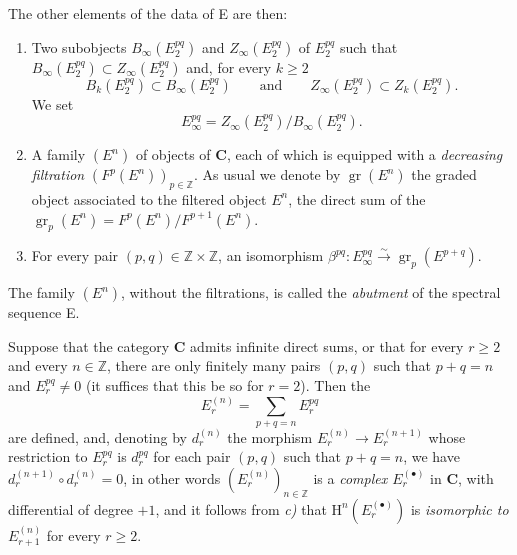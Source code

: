 \begin{env}[11.1.1]
The other elements of the data of E are then:
\begin{enumerate}
  \item[$d)$] Two subobjects $B_\infty(E_2^{pq})$ and
    $Z_\infty(E_2^{pq})$ of $E_2^{pq}$ such that
    $B_\infty(E_2^{pq})\subset Z_\infty(E_2^{pq})$ and, for every $k\geq2$
    \[
      B_k(E_2^{pq})\subset B_\infty(E_2^{pq})
      \qquad\text{and}\qquad
      Z_\infty(E_2^{pq})\subset Z_k(E_2^{pq}).
    \]
    We set
    \[
    \label{0.11.1.1.3}
      E_\infty^{pq}=Z_\infty(E_2^{pq})/B_\infty(E_2^{pq}).
      \tag{11.1.1.3}
    \]
  \item[$e)$]
    A family $(E^n)$ of objects of $\boldsymbol{C}$, each of which is equipped with a
    \emph{decreasing filtration} $(F^p(E^n))_{p\in\mathbb Z}$. As usual we
    denote by $\operatorname{gr}(E^n)$ the graded object associated to the
    filtered object $E^n$, the direct sum of the
    $\operatorname{gr}_p(E^n)=F^p(E^n)/F^{p+1}(E^n)$.
  \item[$f)$] For every pair $(p,q)\in\mathbb Z\times\mathbb Z$, an
    isomorphism
    $\beta^{pq}:E_\infty^{pq}\xrightarrow{\sim}
    \operatorname{gr}_p(E^{p+q})$.
\end{enumerate}

The family $(E^n)$, without the filtrations, is called the \emph{abutment}
of the spectral sequence E.

Suppose that the category $\boldsymbol{C}$ admits infinite direct sums,
or that for every $r\geq2$ and every $n\in\mathbb Z$, there are only finitely
many pairs $(p,q)$ such that $p+q=n$ and $E_r^{pq}\ne0$ (it suffices that this be
so for $r=2$). Then the
\[
  E_r^{(n)}=\sum_{p+q=n}E_r^{pq}
\]
are defined, and, denoting by $d_r^{(n)}$ the morphism
$E_r^{(n)}\to E_r^{(n+1)}$ whose restriction to $E_r^{pq}$ is $d_r^{pq}$
for each pair $(p,q)$ such that $p+q=n$, we have
$d_r^{(n+1)}\circ d_r^{(n)}=0$, in other words $(E_r^{(n)})_{n\in\mathbb Z}$
is a \emph{complex $E_r^{(\bullet)}$} in $\boldsymbol{C}$, with differential of
degree $+1$, and it follows from \emph{c)} that
$\mathrm H^n(E_r^{(\bullet)})$ is \emph{isomorphic to} $E_{r+1}^{(n)}$ for every
$r\geq2$.
\end{env}

